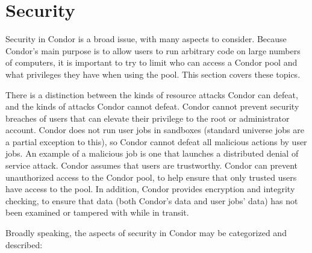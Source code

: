 \section{\label{sec:Security}Security}

Security in Condor is a broad issue, with many aspects to consider.
Because Condor's main purpose is to allow users to run arbitrary code
on large numbers of computers, it is important to try to limit who can
access a Condor pool and what privileges they have when using the
pool.  This section covers these topics.

There is a distinction between the
kinds of resource attacks Condor can defeat,
and the kinds of attacks Condor cannot defeat.
Condor cannot
prevent security breaches of users that can elevate their privilege to
the root or administrator account.
Condor does not run user jobs in
sandboxes (standard universe jobs are a partial exception to this),
so Condor cannot defeat all malicious actions by user jobs.
An example of a malicious job is
one that launches a distributed denial of service attack.
Condor assumes that users are trustworthy.
Condor can prevent unauthorized access to the Condor pool,
to help ensure that only trusted users have access to the pool.
In addition, Condor provides encryption and
integrity checking, to ensure that data (both Condor's data and user
jobs' data) has not been examined or tampered with while in transit.

Broadly speaking, the aspects of security in
Condor may be categorized and described: 

